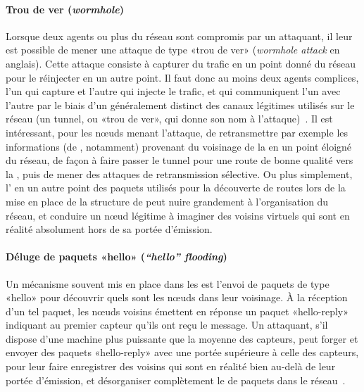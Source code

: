         \paragraph{Trou de ver (\textit{wormhole})}
Lorsque deux agents ou plus du réseau sont compromis par un attaquant, il leur est possible de mener une attaque de type «trou de ver» (\textit{wormhole attack} en anglais).
Cette attaque consiste à capturer du trafic en un point donné du réseau pour le réinjecter en un autre point.
Il faut donc au moins deux agents complices, l'un qui capture et l'autre qui injecte le trafic, et qui communiquent l'un avec l'autre par le biais d'un  généralement distinct des canaux légitimes utilisés sur le réseau (un tunnel, ou «trou de ver», qui donne son nom à l'attaque)~\cite{FZM14}.
Il est intéressant, pour les nœuds menant l'attaque, de retransmettre par exemple les informations (de , notamment) provenant du voisinage de la \sdb en un point éloigné du réseau, de façon à faire passer le tunnel pour une route de bonne qualité vers la \sdb, puis de mener des attaques de retransmission sélective.
Ou plus simplement, l' en un autre point des paquets utilisés pour la découverte de routes lors de la mise en place de la structure de  peut nuire grandement à l'organisation du réseau, et conduire un nœud légitime à imaginer des voisins virtuels qui sont en réalité absolument hors de sa portée d'émission.

        \paragraph{Déluge de paquets «hello» (\textit{“hello” flooding})}
Un mécanisme souvent mis en place dans les \rcs est l'envoi de paquets de type «hello» pour découvrir quels sont les nœuds dans leur voisinage.
À la réception d'un tel paquet, les nœuds voisins émettent en réponse un paquet «hello-reply» indiquant au premier capteur qu'ils ont reçu le message.
Un attaquant, s'il dispose d'une machine plus puissante que la moyenne des capteurs, peut forger et envoyer des paquets «hello-reply» avec une portée supérieure à celle des capteurs, pour leur faire enregistrer des voisins qui sont en réalité bien au-delà de leur portée d'émission, et désorganiser complètement le  de paquets dans le réseau~\cite{AD14}.

